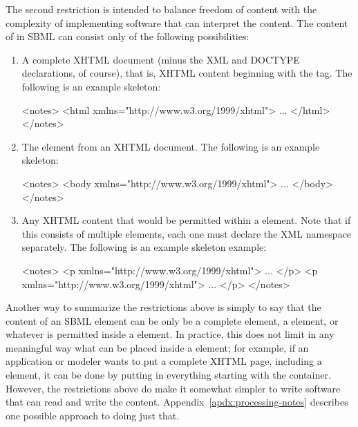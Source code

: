 The second restriction is intended to balance freedom of content
with the complexity of implementing software that can interpret
the content.  The content of  in SBML can consist
only of the following possibilities:
\begin{enumerate}
  
\item A complete XHTML document (minus the XML and DOCTYPE
  declarations, of course), that is, XHTML content beginning with
  the  tag.  The following is an example skeleton:
  \begin{example}
<notes>
    <html xmlns="http://www.w3.org/1999/xhtml">
      ...
    </html>
</notes>\end{example}

\item The  element from an XHTML document.  The
  following is an example skeleton:
  \begin{example}
<notes>
    <body xmlns="http://www.w3.org/1999/xhtml">
      ...
    </body>
</notes>\end{example}
  
\item Any XHTML content that would be permitted within a
   element.  Note that if this consists of multiple
  elements, each one must declare the XML namespace separately.
  The following is an example skeleton example:
  \begin{example}
<notes>
    <p xmlns="http://www.w3.org/1999/xhtml">
      ...
    </p>
    <p xmlns="http://www.w3.org/1999/xhtml">
      ...
    </p>
</notes>\end{example}

\end{enumerate}

Another way to summarize the restrictions above is simply to say
that the content of an SBML  element can be only be a
complete  element, a  element, or whatever
is permitted inside a  element.  In practice, this
does not limit in any meaningful way what can be placed inside a
 element; for example, if an application or modeler
wants to put a complete XHTML page, including a 
element, it can be done by putting in everything starting with the
 container.  However, the restrictions above do make
it somewhat simpler to write software that can read and write the
 content.  Appendix~\ref{apdx:processing-notes}
describes one possible approach to doing just that.


